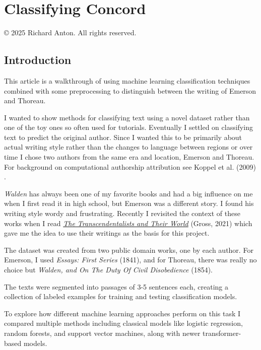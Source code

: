 \documentclass[
]{article}
\author{}
\date{}
\begin{document}
\section{Classifying Concord}

\label{classifying-concord}

© 2025 Richard Anton. All rights reserved.

\subsection{Introduction}\label{introduction}

This article is a walkthrough of using machine learning classification
techniques combined with some preprocessing to distinguish between the
writing of Emerson and Thoreau.

I wanted to show methods for classifying text using a novel dataset
rather than one of the toy ones so often used for tutorials. Eventually
I settled on classifying text to predict the original author. Since I
wanted this to be primarily about actual writing style rather than the
changes to language between regions or over time I chose two authors
from the same era and location, Emerson and Thoreau. For background on
computational authorship attribution see Koppel et al. (2009) .

\emph{Walden} has always been one of my favorite books and had a big
influence on me when I first read it in high school, but Emerson was a
different story. I found his writing style wordy and frustrating.
Recently I revisited the context of these works when I read
\emph{\href{https://us.macmillan.com/books/9780374279325/thetranscendentalistsandtheirworld/}{The
Transcendentalists and Their World}} (Gross, 2021) which gave me the
idea to use their writings as the basis for this project.

The dataset was created from two public domain works, one by each
author. For Emerson, I used \emph{Essays: First Series} (1841), and for
Thoreau, there was really no choice but \emph{Walden, and On The Duty Of
Civil Disobedience} (1854).

The texts were segmented into passages of 3-5 sentences each, creating a
collection of labeled examples for training and testing classification
models.

To explore how different machine learning approaches perform on this
task I compared multiple methods including classical models like logistic regression, random forests, and support vector machines, along with newer transformer-based models.
\end{document}
